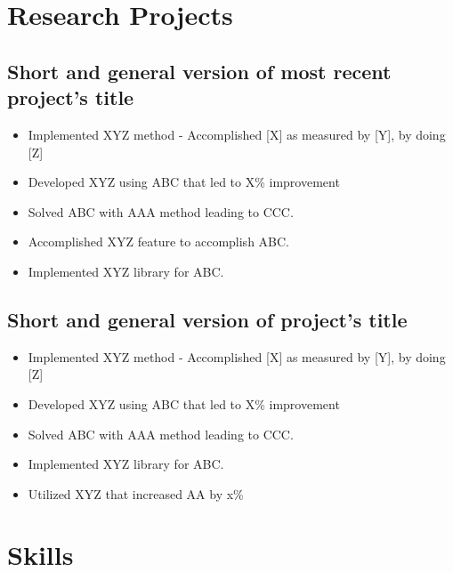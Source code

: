\documentclass[11pt]{article}
\begin{document}
    \section{Research Projects}
    \subsection{Short and general version of most recent project's title} %
    \begin{itemize}
        \item[\checkmark] Implemented XYZ method - Accomplished [X] as measured by [Y], by doing [Z] 
        \item[\checkmark] Developed XYZ using ABC that led to X\% improvement 
        \item[\checkmark] Solved ABC with AAA method leading to CCC.
        \item[\checkmark] Accomplished XYZ feature to accomplish ABC.
        \item[\checkmark] Implemented XYZ library for ABC.
    \end{itemize}
    \subsection{Short and general version of project's title} %
    \begin{itemize}
        \item[\checkmark] Implemented XYZ method - Accomplished [X] as measured by [Y], by doing [Z] 
        \item[\checkmark] Developed XYZ using ABC that led to X\% improvement 
        \item[\checkmark] Solved ABC with AAA method leading to CCC.
        \item[\checkmark] Implemented XYZ library for ABC.
        \item[\checkmark] Utilized XYZ that increased AA by x\%
    \end{itemize}
    \section{Skills}
\end{document}
